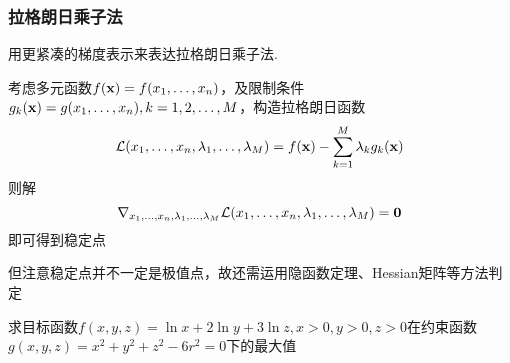 \subsubsection{拉格朗日乘子法}
用更紧凑的梯度表示来表达拉格朗日乘子法.\par
考虑多元函数$f(\mathbf{x})=f(x_1,\ldots,x_n)$，及限制条件$g_k(\mathbf{x})=g(x_1,\ldots,x_n),k=1,2,\ldots,M$，构造拉格朗日函数
\[\mathcal{L}(x_1,\ldots,x_n,\lambda_1,\ldots,\lambda_M)=f(\mathbf{x})-\sum_{k=1}^M\lambda_kg_k(\mathbf{x})\]
则解
\[\nabla_{x_1,\ldots,x_n,\lambda_1,\ldots,\lambda_M}\mathcal{L}(x_1,\ldots,x_n,\lambda_1,\ldots,\lambda_M)=\mathbf{0}\]
即可得到稳定点
\par 但注意稳定点并不一定是极值点，故还需运用隐函数定理、Hessian矩阵等方法判定
\begin{example}
求目标函数$f(x,y,z)=\ln x+2\ln y+3\ln z,x>0,y>0,z>0$在约束函数$g(x,y,z)=x^2+y^2+z^2-6r^2=0$下的最大值
\end{example}
